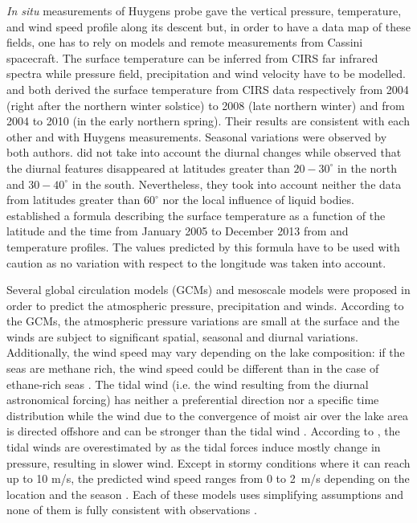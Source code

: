 \textit{In situ} measurements of Huygens probe gave the vertical pressure, temperature, and wind speed profile along its descent but, in order to have a data map of these fields, one has to rely on models and remote measurements from Cassini spacecraft. The surface temperature can be inferred from CIRS far infrared spectra while pressure field, precipitation and wind velocity have to be modelled. \citet{jennings2009titan} and \citet{cottini2012spatial} both derived the surface temperature from CIRS data respectively from 2004 (right after the northern winter solstice) to 2008 (late northern winter) and from 2004 to 2010 (in the early northern spring). Their results are consistent with each other and with Huygens measurements. Seasonal variations were observed by both authors. \citet{jennings2009titan} did not take into account the diurnal changes while \citet{cottini2012spatial} observed that the diurnal features disappeared at latitudes greater than $20-30^\circ$ in the north and $30-40^\circ$ in the south. Nevertheless, they took into account neither the data from latitudes greater than $60^\circ$ nor the local influence of liquid bodies. \citet{tan2015titan} established a formula describing the surface temperature as a function of the latitude and the time from January 2005 to December 2013 from \citet{jennings2011seasonal} and \citet{cottini2012spatial} temperature profiles. The values predicted by this formula have to be used with caution as no variation with respect to the longitude was taken into account.

Several global circulation models (GCMs) \citep[e.g.][]{tokano2008dune, tokano2009impact, friedson2009global, lebonnois2012titan,newman2011stratospheric,newman2016simulating, schneider2012polar} and mesoscale models \citep{soto2015mesoscale,charnay2015methane} were proposed in order to predict the atmospheric pressure, precipitation and winds. According to the GCMs, the atmospheric pressure variations are small at the surface and the winds are subject to significant spatial, seasonal and diurnal variations. Additionally, the wind speed may vary depending on the lake composition: if the seas are methane rich, the wind speed could be different than in the case of ethane-rich seas \citep{tokano2009impact,lorenz2012winds}. The tidal wind (i.e. the wind resulting from the diurnal astronomical forcing) has neither a preferential direction nor a specific time distribution while the wind due to the convergence of moist air over the lake area is directed offshore and can be stronger than the tidal wind \citep{tokano2009impact}. According to \cite{charnay2014Thesis}, the tidal winds are overestimated by \cite{tokano2009impact} as the tidal forces induce mostly change in pressure, resulting in slower wind. Except in stormy conditions where it can reach up to 10 m/s, the predicted wind speed ranges from 0 to 2~m/s depending on the location and the season \citep{lorenz2012winds, lorenz2013oceanography}. Each of these models uses simplifying assumptions and none of them is fully consistent with observations \citep{schneider2012polar}. 

